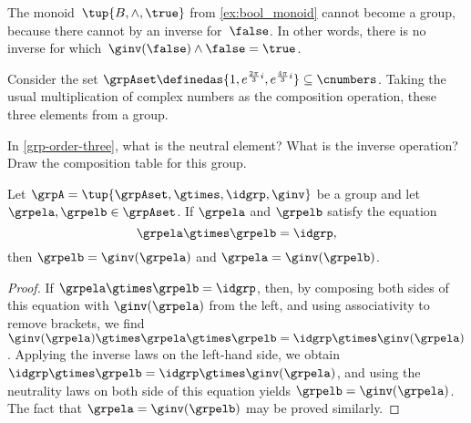 \begin{example}
  The monoid~$\tup{B,\wedge, \true}$ from \cref{ex:bool_monoid} cannot become a group, because there cannot by an inverse for~$\false$. In other words, there is no inverse for which~$\ginv(\false)\wedge \false=\true$.
\end{example}
\begin{example}
  \label{grp-order-three}
  Consider the set $\grpAset \definedas \{ 1, e^{\frac{2\pi}{3} i}, e^{\frac{4\pi }{3}i}  \} \subseteq \cnumbers$.
  Taking the usual multiplication of complex numbers as the composition operation, these three elements from a group.
\end{example}

\begin{gradedexercise}
  In \cref{grp-order-three}, what is the neutral element? What is the inverse operation?
  Draw the composition table for this group.
\end{gradedexercise}

\begin{solution}
\end{solution}


\begin{lemma}
 \label{lem:inv-op-unique}
Let $\grpA = \tup{ \grpAset, \gtimes, \idgrp, \ginv }$ be a group and let $\grpela, \grpelb \in \grpAset$. If $\grpela$ and $\grpelb$ satisfy the equation
$$
\grpela \gtimes \grpelb = \idgrp,
$$
then $\grpelb = \ginv( \grpela )$ and $\grpela = \ginv(\grpelb)$. 
\end{lemma}

\begin{proof}
If $\grpela \gtimes \grpelb = \idgrp$, then, by composing both sides of this equation with $\ginv(\grpela)$ from the left, and using associativity to remove brackets, we find $\ginv(\grpela) \gtimes \grpela \gtimes \grpelb = \idgrp \gtimes \ginv(\grpela)$. Applying the inverse laws on the left-hand side, we obtain $\idgrp \gtimes \grpelb = \idgrp \gtimes \ginv(\grpela)$, and using the neutrality laws on both side of this equation yields $ \grpelb =  \ginv(\grpela)$. The fact that $\grpela = \ginv(\grpelb)$ may be proved similarly. 
\end{proof}


